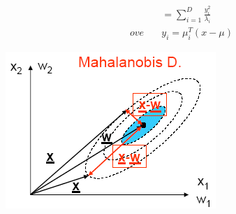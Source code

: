 \documentclass[a4paper,8pt]{article}
\newenvironment{Figure}
  {\par\medskip\noindent\minipage{\linewidth}}
  {\endminipage\par\medskip}
\begin{document}
\begin{multicols}{2}
\begin{equation}
\begin{split}
&=\sum_{i=1}^{D} \frac{y_{i}^2}{\lambda_{i}}\\
ove\quad &y_{i} = \mu_{i}^T (x - \mu) 
\end{split}
\end{equation}
\begin{Figure}
 \centering
 \includegraphics[width=\linewidth]{mahalanobis}
\end{Figure}

\end{multicols}
\end{document}

